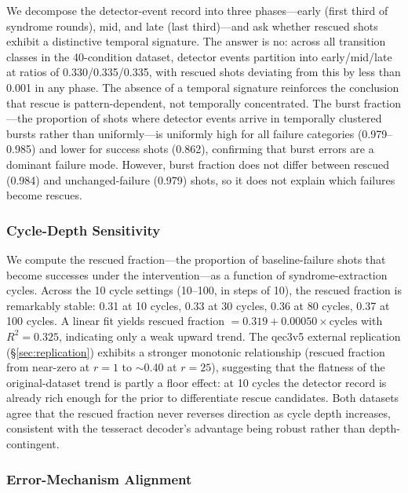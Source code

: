 We decompose the detector-event record into three phases---early (first third of syndrome rounds), mid, and late (last third)---and ask whether rescued shots exhibit a distinctive temporal signature. The answer is no: across all transition classes in the 40-condition dataset, detector events partition into early/mid/late at ratios of 0.330/0.335/0.335, with rescued shots deviating from this by less than 0.001 in any phase. The absence of a temporal signature reinforces the conclusion that rescue is pattern-dependent, not temporally concentrated. The burst fraction---the proportion of shots where detector events arrive in temporally clustered bursts rather than uniformly---is uniformly high for all failure categories (0.979--0.985) and lower for success shots (0.862), confirming that burst errors are a dominant failure mode. However, burst fraction does not differ between rescued (0.984) and unchanged-failure (0.979) shots, so it does not explain which failures become rescues.

\subsubsection{Cycle-Depth Sensitivity}

We compute the rescued fraction---the proportion of baseline-failure shots that become successes under the intervention---as a function of syndrome-extraction cycles. Across the 10 cycle settings (10--100, in steps of 10), the rescued fraction is remarkably stable: 0.31 at 10 cycles, 0.33 at 30 cycles, 0.36 at 80 cycles, 0.37 at 100 cycles. A linear fit yields rescued fraction $= 0.319 + 0.00050 \times \text{cycles}$ with $R^2 = 0.325$, indicating only a weak upward trend. The qec3v5 external replication (\S\ref{sec:replication}) exhibits a stronger monotonic relationship (rescued fraction from near-zero at $r=1$ to $\sim$0.40 at $r=25$), suggesting that the flatness of the original-dataset trend is partly a floor effect: at 10 cycles the detector record is already rich enough for the prior to differentiate rescue candidates. Both datasets agree that the rescued fraction never reverses direction as cycle depth increases, consistent with the tesseract decoder's advantage being robust rather than depth-contingent.

\subsubsection{Error-Mechanism Alignment}

